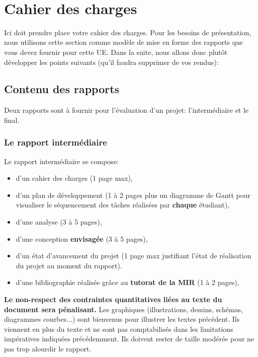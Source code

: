 \documentclass[a4paper,12pt]{article}
\begin{document}
~

\tableofcontents

\newpage

\section{Cahier des charges}
Ici doit prendre place votre cahier des charges.
Pour les besoins de présentation, nous utilisons cette section comme modèle de mise en forme des rapports que vous devez fournir pour cette UE.
Dans la suite, nous allons donc plutôt développer les points suivants (qu'il faudra supprimer de vos rendus):

\subsection{Contenu des rapports}
Deux rapports sont à fournir pour l'évaluation d'un projet: l'intermédiaire et le final.


\subsubsection{Le rapport intermédiaire}
Le rapport intermédiaire se compose:
\begin{itemize}
\item d'un cahier des charges (1 page max),
\item d'un plan de développement (1 à 2 pages plus un
  diagramme de Gantt pour visualiser le séquencement des tâches réalisées par
  \textbf{chaque} étudiant),
\item d'une analyse (3 à 5 pages),
\item d'une conception \textbf{envisagée} (3 à 5 pages),
\item d'un état d'avancement du projet (1 page max justifiant l'état de
  réalisation du projet au moment du rapport).
\item d'une bibliographie réalisée grâce au \textbf{tutorat de la MIR} (1 à 2 pages),
\end{itemize}

\textbf{Le non-respect des contraintes quantitatives liées au texte du
  document sera pénalisant.}
Les graphiques (illustrations, dessins, schémas, diagrammes courbes...) sont
bienvenus pour illustrer les textes précédent. Ils viennent en plus du texte et
ne sont pas comptabilisés dans les limitations impératives indiquées
précédemment. Ils doivent rester de taille modérée pour ne pas trop alourdir
le rapport.
\end{document}
